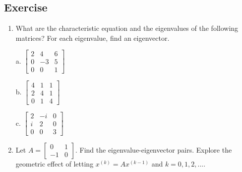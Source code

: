 \documentclass[math101_lecturenotes_ku.tex]{subfiles}
\begin{document}
\subsection{Exercise}
\begin{enumerate}
    \item What are the characteristic equation and the eigenvalues of the following matrices? For each eigenvalue, find an eigenvector.
    \begin{multicols}{3}
     a. $\begin{bmatrix}
            2 & 4 & 6 \\
            0 & -3 & 5 \\
            0 & 0 & 1
        \end{bmatrix}$

        \columnbreak

       b. $\begin{bmatrix}
            4 & 1 & 1 \\
            2 & 4 & 1 \\
            0 & 1 & 4
        \end{bmatrix}$
        \columnbreak

        c. $\begin{bmatrix}
            2 & -i & 0 \\
            i & 2 & 0 \\
            0 & 0 & 3
        \end{bmatrix}$
    \end{multicols}

    \item Let $A= \begin{bmatrix}
        0 & 1 \\
        -1 & 0
    \end{bmatrix}$. Find the eigenvalue-eigenvector pairs. Explore the geometric effect of letting $\displaystyle x^{(k)}=Ax^{(k-1)}$ and $k=0,1,2,...$.
  \end{enumerate}
\end{document}

